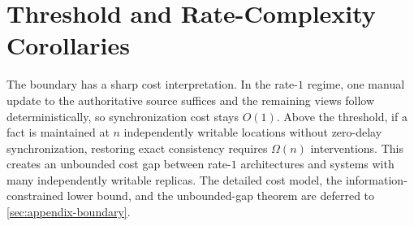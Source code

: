 \section{Threshold and Rate-Complexity Corollaries}\label{sec:rate-corollaries}

The boundary has a sharp cost interpretation. In the rate-$1$ regime, one manual update to the authoritative source suffices and the remaining views follow deterministically, so synchronization cost stays $O(1)$. Above the threshold, if a fact is maintained at $n$ independently writable locations without zero-delay synchronization, restoring exact consistency requires $\Omega(n)$ interventions. This creates an unbounded cost gap between rate-$1$ architectures and systems with many independently writable replicas. The detailed cost model, the information-constrained lower bound, and the unbounded-gap theorem are deferred to \ref{sec:appendix-boundary}.
